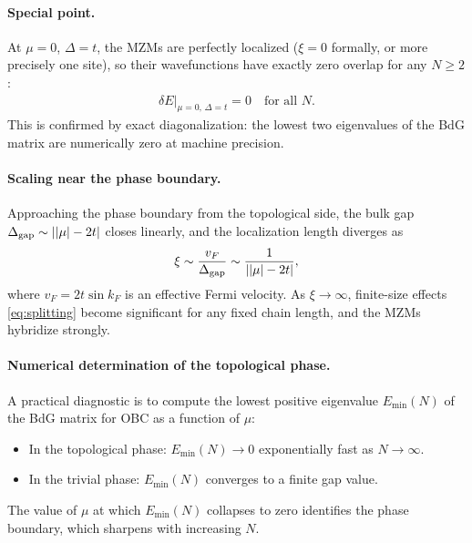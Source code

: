 \paragraph{Special point.}
At $\mu = 0$, $\Delta = t$, the MZMs are perfectly localized ($\xi = 0$ formally, or more precisely one site), so their wavefunctions have exactly zero overlap for any $N \geq 2$:
\begin{align}
    \delta E\big|_{\mu=0,\,\Delta=t} = 0 \quad \text{for all } N.
\end{align}
This is confirmed by exact diagonalization: the lowest two eigenvalues of the BdG matrix are numerically zero at machine precision.

\paragraph{Scaling near the phase boundary.}
Approaching the phase boundary from the topological side, the bulk gap $\Delta_{\rm gap} \sim ||\mu| - 2t|$ closes linearly, and the localization length diverges as
\begin{align}
    \xi \sim \frac{v_F}{\Delta_{\rm gap}} \sim \frac{1}{||\mu| - 2t|},
\end{align}
where $v_F = 2t\sin k_F$ is an effective Fermi velocity. As $\xi \to \infty$, finite-size effects \eqref{eq:splitting} become significant for any fixed chain length, and the MZMs hybridize strongly.

\paragraph{Numerical determination of the topological phase.}
A practical diagnostic is to compute the lowest positive eigenvalue $E_{\min}(N)$ of the BdG matrix for OBC as a function of $\mu$:
\begin{itemize}
    \item In the topological phase: $E_{\min}(N) \to 0$ exponentially fast as $N \to \infty$.
    \item In the trivial phase: $E_{\min}(N)$ converges to a finite gap value.
\end{itemize}
The value of $\mu$ at which $E_{\min}(N)$ collapses to zero identifies the phase boundary, which sharpens with increasing $N$.
